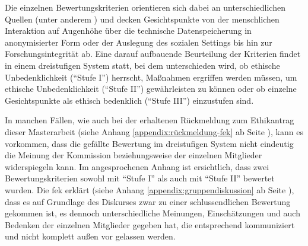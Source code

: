 \documentclass[a4paper,12pt,twoside,numbers=noendperiod]{scrreprt}
\begin{document}
Die einzelnen Bewertungskriterien orientieren sich dabei an unterschiedlichen Quellen (unter anderem \cite{manzeschke_meestar_2015, marckmann_was_2000, schuchter_care_2018}) und decken Gesichtspunkte von der menschlichen Interaktion auf Augenhöhe über die technische Datenspeicherung in anonymisierter Form oder der Auslegung des sozialen Settings bis hin zur Forschungsintegrität ab. Eine darauf aufbauende Beurteilung der Kriterien findet in einem dreistufigen System statt, bei dem unterschieden wird, ob ethische Unbedenklichkeit (\enquote{Stufe I}) herrscht, Maßnahmen ergriffen werden müssen, um ethische Unbedenklichkeit (\enquote{Stufe II}) gewährleisten zu können oder ob einzelne Gesichtspunkte als ethisch bedenklich (\enquote{Stufe III}) einzustufen sind. \cite[1]{forschungsethik-kommission_der_fachhochschule_vorarlberg_kriterienkatalog_2021}

\medskip

In manchen Fällen, wie auch bei der erhaltenen Rückmeldung zum Ethikantrag dieser Masterarbeit (siehe Anhang \ref{appendix:rückmeldung-fek} ab Seite \pageref{appendix:rückmeldung-fek}), kann es vorkommen, dass die gefällte Bewertung im dreistufigen System nicht eindeutig die Meinung der Kommission beziehungsweise der einzelnen Mitglieder widerspiegeln kann. Im angesprochenen Anhang ist ersichtlich, dass zwei Bewertungskriterien sowohl mit \enquote{Stufe I} als auch mit \enquote{Stufe II} bewertet wurden. Die \ac{fek} erklärt (siehe Anhang \ref{appendix:gruppendiskussion} ab Seite \pageref{appendix:gruppendiskussion}), dass es auf Grundlage des Diskurses zwar zu einer schlussendlichen Bewertung gekommen ist, es dennoch unterschiedliche Meinungen, Einschätzungen und auch Bedenken der einzelnen Mitglieder gegeben hat, die entsprechend kommuniziert und nicht komplett außen vor gelassen werden.

\medskip
\end{document}
